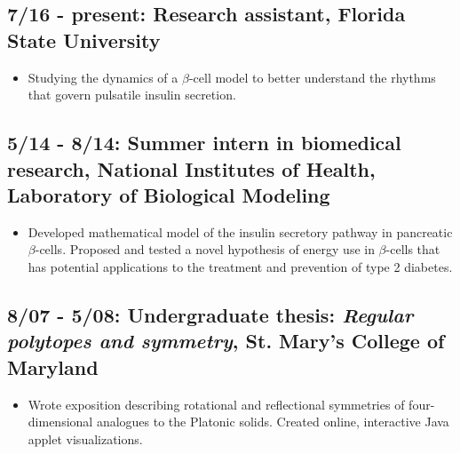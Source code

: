 \documentclass[11pt]{cv}
\begin{document}
\subsection*{7/16 - present: Research assistant, Florida State University}
\label{sec:orgheadline7}
\begin{itemize}
\item Studying the dynamics of a \(\beta\)-cell model to better understand the rhythms that govern pulsatile insulin secretion.\\
\end{itemize}
\subsection*{5/14 - 8/14: Summer intern in biomedical research, National Institutes of Health, Laboratory of Biological Modeling}
\label{sec:orgheadline8}
\begin{itemize}
\item Developed mathematical model of the insulin secretory pathway in pancreatic \(\beta\)-cells. Proposed and tested a novel hypothesis of energy use in \(\beta\)-cells that has potential applications to the treatment and prevention of type 2 diabetes.\\
\end{itemize}
\subsection*{8/07 - 5/08: Undergraduate thesis: \emph{Regular polytopes and symmetry}, St. Mary's College of Maryland}
\label{sec:orgheadline9}
\begin{itemize}
\item Wrote exposition describing rotational and reflectional symmetries of four-dimensional analogues to the Platonic solids. Created online, interactive Java applet visualizations.\\
\end{itemize}
\end{document}
